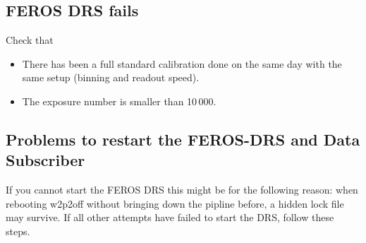 \documentclass[11pt,fleqn]{book} %
\begin{document}
\subsection{FEROS DRS fails}

Check that
\begin{itemize}
    \item There has been a full standard calibration done on the same day with the same setup (binning and readout speed).
    \item The exposure number is smaller than 10\,000.
\end{itemize}

\subsection{Problems to restart the FEROS-DRS and Data Subscriber}


If you cannot start the FEROS DRS this might be for the following reason: when rebooting w2p2off without bringing down the pipline before, a hidden lock file may survive. If all other attempts have failed to start the DRS, follow these steps.
\end{document}
